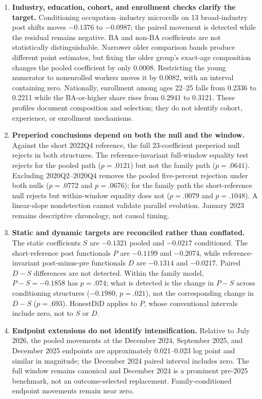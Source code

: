 \documentclass[11pt,letterpaper]{article}
\begin{document}
\begin{enumerate}[leftmargin=1.8em]
\item \textbf{Industry, education, cohort, and enrollment checks clarify the target.}  Conditioning occupation--industry microcells on 13 broad-industry post shifts moves $-0.1376$ to $-0.0987$; the paired movement is detected while the residual remains negative.  BA and non-BA coefficients are not statistically distinguishable.  Narrower older comparison bands produce different point estimates, but fixing the older group's exact-age composition changes the pooled coefficient by only 0.0008.  Restricting the young numerator to nonenrolled workers moves it by 0.0082, with an interval containing zero.  Nationally, enrollment among ages 22--25 falls from 0.2336 to 0.2211 while the BA-or-higher share rises from 0.2941 to 0.3121.  These profiles document composition and selection; they do not identify cohort, experience, or enrollment mechanisms.
\item \textbf{Preperiod conclusions depend on both the null and the window.}  Against the short 2022Q4 reference, the full 23-coefficient preperiod null rejects in both structures.  The reference-invariant full-window equality test rejects for the pooled path ($p=.0121$) but not the family path ($p=.0641$).  Excluding 2020Q2--2020Q4 removes the pooled five-percent rejection under both nulls ($p=.0772$ and $p=.0676$); for the family path the short-reference null rejects but within-window equality does not ($p=.0079$ and $p=.1048$).  A linear-slope nondetection cannot validate parallel evolution.  January 2023 remains descriptive chronology, not causal timing.
\item \textbf{Static and dynamic targets are reconciled rather than conflated.}  The static coefficients $S$ are $-0.1321$ pooled and $-0.0217$ conditioned.  The short-reference post functionals $P$ are $-0.1199$ and $-0.2074$, while reference-invariant post-minus-pre functionals $D$ are $-0.1314$ and $-0.0217$.  Paired $D-S$ differences are not detected.  Within the family model, $P-S=-0.1858$ has $p=.074$; what is detected is the change in $P-S$ across conditioning structures ($-0.1980$, $p=.021$), not the corresponding change in $D-S$ ($p=.693$).  HonestDiD applies to $P$, whose conventional intervals include zero, not to $S$ or $D$.
\item \textbf{Endpoint extensions do not identify intensification.}  Relative to July 2026, the pooled movements at the December 2024, September 2025, and December 2025 endpoints are approximately 0.021--0.023 log point and similar in magnitude; the December 2024 paired interval includes zero.  The full window remains canonical and December 2024 is a prominent pre-2025 benchmark, not an outcome-selected replacement.  Family-conditioned endpoint movements remain near zero.

\end{enumerate}
\end{document}
